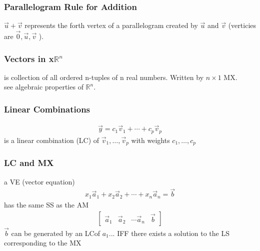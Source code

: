 \documentclass[12pt]{article}
\newcommand{\R}{\mathbb{R}}
\begin{document}
    \subsubsection{Parallelogram Rule for Addition}
         $ \vec u + \vec v $  represents the forth vertex of a parallelogram created
         by $ \vec u $  and $ \vec v $  (verticies are $ \vec 0,\vec u,\vec v $ ).
    \subsubsection{Vectors in x$ \R^{n} $}
        is collection of all ordered n-tuples of n real numbers. Written by
        $ n \times 1 $ MX. \\
        see algebraic properties of $ \R^{n} $. 
    \subsubsection{Linear Combinations}
       \begin{align*}
           \vec y = c_{1}\vec v_{1} + \cdots + c_{p}\vec v_{p}
       \end{align*} 
       is a linear combination (LC) of $ \vec v_{1},\dots,\vec v_{p} $ with
       weights $ c_{1},\dots,c_{p} $ 
    \subsubsection{LC and MX}
    a VE (vector equation)
        \begin{align*}
            x_{1}\vec a_{1} + x_{2}\vec a_{2} + \cdots + x_{n}\vec a_{n} = \vec b
        \end{align*}
        has the same SS as the AM
        \begin{align*}
            \begin{bmatrix}
                \vec a_{1} & \vec a_{2} & \cdots \vec a_{n} & \vec b 
            \end{bmatrix}
        \end{align*}
        $ \vec b $  can be generated by an LCof $ a_{1}... $  IFF
        there exists a solution to the LS corresponding to the MX 
\end{document}
